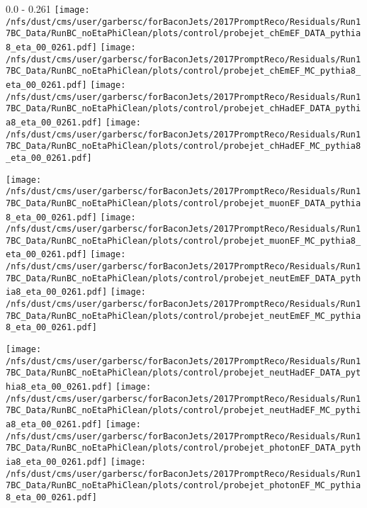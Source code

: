 \documentclass[t,compress]{beamer}
\begin{document}
\begin{frame}{0.0 - 0.261}
	\texttt{[image: /nfs/dust/cms/user/garbersc/forBaconJets/2017PromptReco/Residuals/Run17BC\_Data/RunBC\_noEtaPhiClean/plots/control/probejet\_chEmEF\_DATA\_pythia8\_eta\_00\_0261.pdf]}
	\texttt{[image: /nfs/dust/cms/user/garbersc/forBaconJets/2017PromptReco/Residuals/Run17BC\_Data/RunBC\_noEtaPhiClean/plots/control/probejet\_chEmEF\_MC\_pythia8\_eta\_00\_0261.pdf]}
	\texttt{[image: /nfs/dust/cms/user/garbersc/forBaconJets/2017PromptReco/Residuals/Run17BC\_Data/RunBC\_noEtaPhiClean/plots/control/probejet\_chHadEF\_DATA\_pythia8\_eta\_00\_0261.pdf]}
	\texttt{[image: /nfs/dust/cms/user/garbersc/forBaconJets/2017PromptReco/Residuals/Run17BC\_Data/RunBC\_noEtaPhiClean/plots/control/probejet\_chHadEF\_MC\_pythia8\_eta\_00\_0261.pdf]}
\newline

\vspace{-0.65cm}
	\texttt{[image: /nfs/dust/cms/user/garbersc/forBaconJets/2017PromptReco/Residuals/Run17BC\_Data/RunBC\_noEtaPhiClean/plots/control/probejet\_muonEF\_DATA\_pythia8\_eta\_00\_0261.pdf]}
	\texttt{[image: /nfs/dust/cms/user/garbersc/forBaconJets/2017PromptReco/Residuals/Run17BC\_Data/RunBC\_noEtaPhiClean/plots/control/probejet\_muonEF\_MC\_pythia8\_eta\_00\_0261.pdf]}
	\texttt{[image: /nfs/dust/cms/user/garbersc/forBaconJets/2017PromptReco/Residuals/Run17BC\_Data/RunBC\_noEtaPhiClean/plots/control/probejet\_neutEmEF\_DATA\_pythia8\_eta\_00\_0261.pdf]}
	\texttt{[image: /nfs/dust/cms/user/garbersc/forBaconJets/2017PromptReco/Residuals/Run17BC\_Data/RunBC\_noEtaPhiClean/plots/control/probejet\_neutEmEF\_MC\_pythia8\_eta\_00\_0261.pdf]}
\newline

\vspace{-0.65cm}
	\texttt{[image: /nfs/dust/cms/user/garbersc/forBaconJets/2017PromptReco/Residuals/Run17BC\_Data/RunBC\_noEtaPhiClean/plots/control/probejet\_neutHadEF\_DATA\_pythia8\_eta\_00\_0261.pdf]}
	\texttt{[image: /nfs/dust/cms/user/garbersc/forBaconJets/2017PromptReco/Residuals/Run17BC\_Data/RunBC\_noEtaPhiClean/plots/control/probejet\_neutHadEF\_MC\_pythia8\_eta\_00\_0261.pdf]}
	\texttt{[image: /nfs/dust/cms/user/garbersc/forBaconJets/2017PromptReco/Residuals/Run17BC\_Data/RunBC\_noEtaPhiClean/plots/control/probejet\_photonEF\_DATA\_pythia8\_eta\_00\_0261.pdf]}
	\texttt{[image: /nfs/dust/cms/user/garbersc/forBaconJets/2017PromptReco/Residuals/Run17BC\_Data/RunBC\_noEtaPhiClean/plots/control/probejet\_photonEF\_MC\_pythia8\_eta\_00\_0261.pdf]}
\end{frame}
\end{document}
